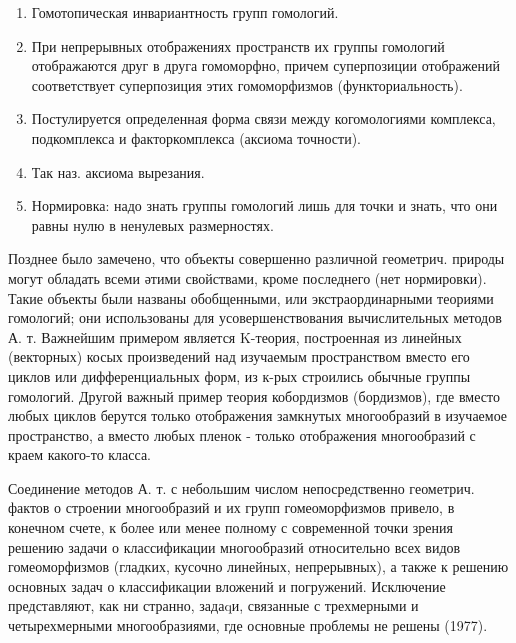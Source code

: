 \documentclass[10pt]{article}
\begin{document}
\begin{enumerate}

  \item Гомотопическая инвариантность групп гомологий.



  \item При непрерывных отображениях пространств их группы гомологий отображаются друг в друга гомоморфно, причем суперпозиции отображений соответствует суперпозиция этих гомоморфизмов (функториальность).



  \item Постулируется определенная форма связи между когомологиями комплекса, подкомплекса и факторкомплекса (аксиома точности).



  \item Так наз. аксиома вырезания.



  \item Нормировка: надо знать группы гомологий лишь для точки и знать, что они равны нулю в ненулевых размерностях.



\end{enumerate}



Позднее было замечено, что объекты совершенно различной геометрич. природы могут обладать всеми әтими свойствами, кроме последнего (нет нормировки). Такие объекты были названы обобщенными, или экстраординарными теориями гомологий; они использованы для усовершенствования вычислительных методов А. т. Важнейшим примером является K-теория, построенная из линейных (векторных) косых произведений над изучаемым пространством вместо его циклов или дифференциальных форм, из к-рых строились обычные группы гомологий. Другой важный пример теория кобордизмов (бордизмов), где вместо любых циклов берутся только отображения замкнутых многообразий в изучаемое пространство, а вместо любых пленок - только отображения многообразий с краем какого-то класса.



Соединение методов А. т. с небольшим числом непосредственно геометрич. фактов о строении многообразий и их групп гомеоморфизмов привело, в конечном счете, к более или менее полному с современной точки зрения решению задачи о классификации многообразий относительно всех видов гомеоморфизмов (гладких, кусочно линейных, непрерывных), а также к решению основных задач о классификации вложений и погружений. Исключение представляют, как ни странно, задаqи, связанные с трехмерными и четырехмерными многообразиями, где основные проблемы не решены (1977).
\end{document}
